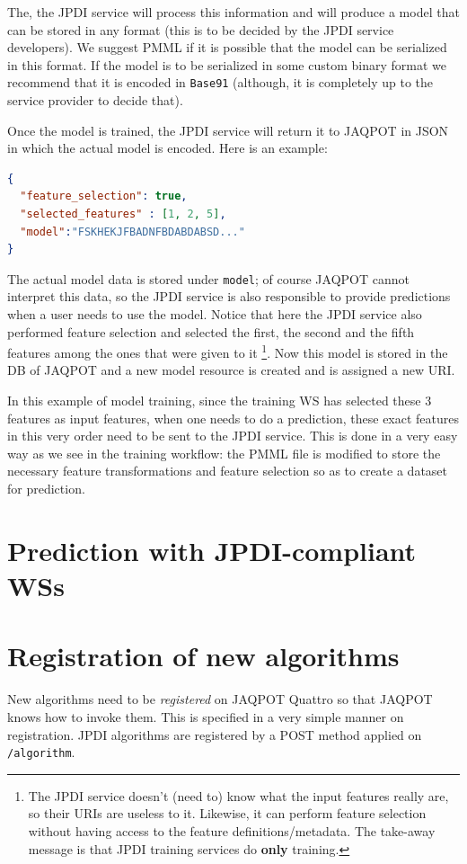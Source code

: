 The, the JPDI service will process this information and will
produce a model that can be stored in any format (this is to 
be decided by the JPDI service developers). We suggest PMML 
if it is possible that the model can be serialized in this 
format. If the model is to be serialized in some custom binary
format we recommend that it is encoded in \texttt{Base91} (although,
it is completely up to the service provider to decide that).


Once the model is trained, the JPDI service will return it
to JAQPOT in JSON in which the actual model is encoded.
Here is an example:

\begin{lstlisting}[language=json]
{
  "feature_selection": true,
  "selected_features" : [1, 2, 5],
  "model":"FSKHEKJFBADNFBDABDABSD..."
} 
\end{lstlisting}

The actual model data is stored under \texttt{model}; of course
JAQPOT cannot interpret this data, so the JPDI service is also 
responsible to provide predictions when a user needs to use 
the model. Notice that here the JPDI service also performed 
feature selection and selected the first, the 
second and the fifth features among the ones that were given to it%
\footnote{The JPDI service doesn't (need to) know what the input features
really are, so their URIs are useless to it. Likewise, it can perform
feature selection without having access to the feature definitions/metadata.
The take-away message is that JPDI training services do \textbf{only} training.}.
Now this model is stored in the DB of JAQPOT and a new model resource is created
and is assigned a new URI.

In this example of model training, since the training
WS has selected these 3 features as input features, 
when one needs to do a prediction, these exact features 
in this very order need to be sent to the JPDI service.
This is done in a very easy way as we see in the training 
workflow: the PMML file is modified to store the necessary
feature transformations and feature selection so as to
create a dataset for prediction.





\section{Prediction with JPDI-compliant WSs}


\section{Registration of new algorithms}
New algorithms need to be \textit{registered} on JAQPOT Quattro
so that JAQPOT knows how to invoke them. This is specified in 
a very simple manner on registration. JPDI algorithms
are registered by a POST method applied on \texttt{/algorithm}.

